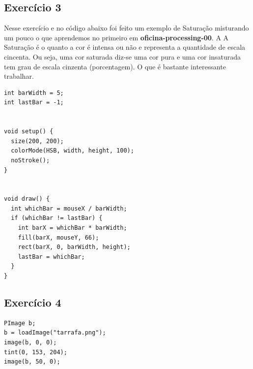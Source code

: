 \documentclass[12pt]{article}
\begin{document}
\subsection{Exercício 3}

\qquad Nesse exercício e no código abaixo foi feito um exemplo de Saturação misturando um pouco o que aprendemos no primeiro em \textbf{oficina-processing-00}. A A Saturação é o quanto a cor é intensa ou não e representa a quantidade de escala cincenta. Ou seja, uma cor saturada diz-se uma cor pura e uma cor insaturada tem grau de escala cinzenta (porcentagem). O que é bastante interessante trabalhar.

\begin{verbatim}
int barWidth = 5;
int lastBar = -1;


void setup() {
  size(200, 200);
  colorMode(HSB, width, height, 100);
  noStroke();
}


void draw() {
  int whichBar = mouseX / barWidth;
  if (whichBar != lastBar) {
    int barX = whichBar * barWidth;
    fill(barX, mouseY, 66);
    rect(barX, 0, barWidth, height);
    lastBar = whichBar;
  }
}
\end{verbatim}

\subsection{Exercício 4}

\begin{verbatim}
PImage b;
b = loadImage("tarrafa.png");
image(b, 0, 0);
tint(0, 153, 204);
image(b, 50, 0);
\end{verbatim}
\end{document}
